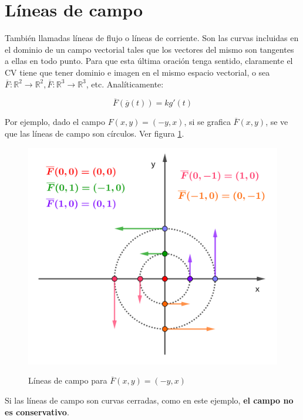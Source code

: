 \documentclass{article}
\renewcommand{\Bbb}{\mathbb}
\begin{document}
\newpage

\section{Líneas de campo}

También llamadas líneas de flujo o líneas de corriente. Son las curvas incluidas en el dominio de un campo vectorial tales que los vectores del mismo son tangentes a ellas en todo punto. Para que esta última oración tenga sentido, claramente el CV tiene que tener dominio e imagen en el mismo espacio vectorial, o sea $\overline{F}: \Bbb R^2 \rightarrow \Bbb R^2, \overline{F}: \Bbb R^3 \rightarrow \Bbb R^3$, etc. Analíticamente:

\begin{equation}
\overline{F}(\overline{g}(t)) = k g'(t)
\end{equation}

Por ejemplo, dado el campo $F(x,y) = (-y,x)$, si se grafica $\overline{F}(x,y)$, se ve que las líneas de campo son círculos. Ver figura \ref{fig:lincamp}.

\begin{figure}[ht]
\centering
\caption{Líneas de campo para $\overline{F}(x,y) = (-y,x)$}
\includegraphics[scale=0.7]{../img/ode/field_lines.png}
\label{fig:lincamp}
\end{figure}

Si las líneas de campo son curvas cerradas, como en este ejemplo, \textbf{el campo no es conservativo}.
\end{document}
